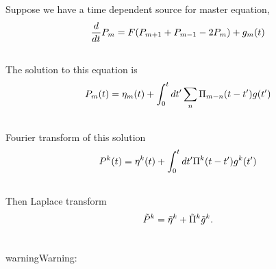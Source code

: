 \documentclass[letterpaper,10pt,english]{sphinxmanual}
\begin{document}
Suppose we have a time dependent source for master equation,
\begin{gather}
\begin{split}\frac{d}{dt}P_m = F(P_{m+1} + P_{m-1} - 2P_m) + g_m(t)\end{split}\notag\\\begin{split}\end{split}\notag
\end{gather}
The solution to this equation is
\begin{gather}
\begin{split}P_m(t) = \eta_m(t) + \int_0^t dt'\sum_n \Pi_{m-n}(t-t') g(t')\end{split}\notag\\\begin{split}\end{split}\notag
\end{gather}
Fourier transform of this solution
\begin{gather}
\begin{split}P^k(t) = \eta^k(t) + \int_0^t dt' \Pi^k(t-t') g^k(t')\end{split}\notag\\\begin{split}\end{split}\notag
\end{gather}
Then Laplace transform
\begin{gather}
\begin{split}\tilde P^k  = \tilde \eta^k + \tilde \Pi^k \tilde g^k  .\end{split}\notag\\\begin{split}\end{split}\notag
\end{gather}
\begin{notice}{warning}{Warning:}
\end{notice}
\end{document}
